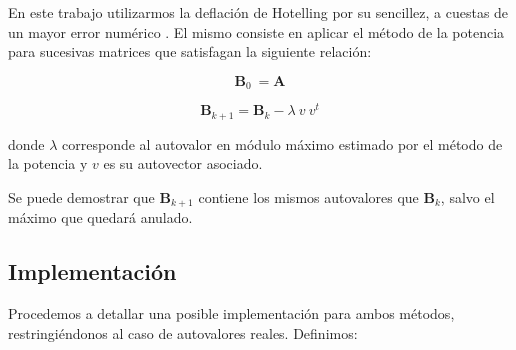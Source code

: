 En este trabajo utilizarmos la deflación de Hotelling por su sencillez, a cuestas de un mayor error numérico \cite{Burden}. El mismo consiste en aplicar el método de la potencia para sucesivas matrices que satisfagan la siguiente relación:

\vspace{1em}
\begin{equation*}
    \mathbf{B}_0\ = \mathbf{A}
\end{equation*}

\begin{equation} \label{deflacion}
    \mathbf{B}_{k+1} = \mathbf{B}_{k} - \lambda\ v\ v^t 
\end{equation}

\vspace{1em}
\noindent donde $\lambda$ corresponde al autovalor en módulo máximo estimado por el método de la potencia y $v$ es su autovector asociado.

\vspace{1em}
Se puede demostrar que $\mathbf{B}_{k+1}$ contiene los mismos autovalores que $\mathbf{B}_{k}$, salvo el máximo que quedará anulado. %









\vspace{2em}
\subsection{Implementación} Procedemos a detallar una posible implementación para ambos métodos, restringiéndonos al caso de autovalores reales. Definimos:

